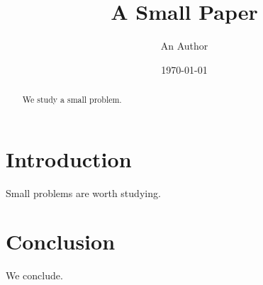 \documentclass{article}
\title{A Small Paper}
\author{An Author}
\date{\today}
\begin{document}
\maketitle

\begin{abstract}
We study a small problem.
\end{abstract}

\section{Introduction}
Small problems are worth studying.

\section{Conclusion}
We conclude.
\end{document}

